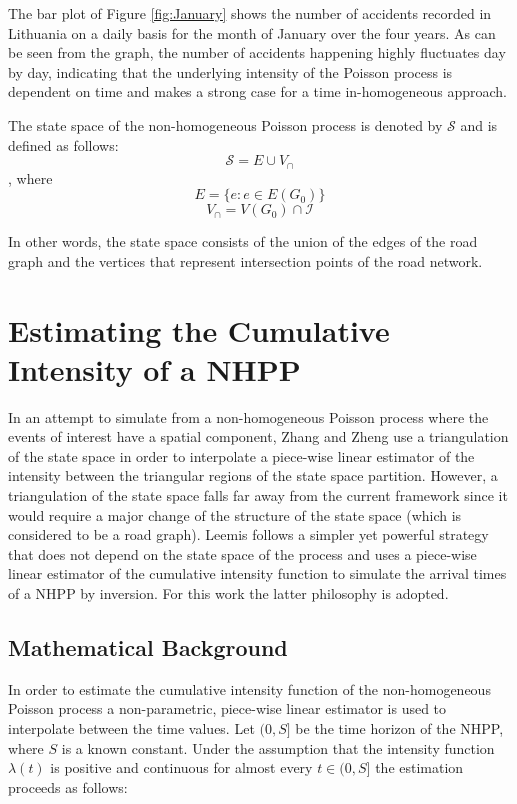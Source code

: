 \documentclass[12pt]{article}
\theoremstyle{definition}
\begin{document}
The bar plot of Figure \ref{fig:January} shows the number of accidents recorded in Lithuania on a daily basis for the month of January over the four years. As can be seen from the graph, the number of accidents happening highly fluctuates day by day, indicating that the underlying intensity of the Poisson process is dependent on time and makes a strong case for a time in-homogeneous approach. 

The state space of the non-homogeneous Poisson process is denoted by $\mathcal{S}$ and is defined as follows:
\begin{equation}
    \mathcal{S} =  E\cup V_{\cap}
\end{equation}, where
\begin{equation*}
    E = \{e: e\in E(G_0)\}
\end{equation*}
\begin{equation*}
    V_{\cap} = V(G_0) \cap \mathcal{I}
\end{equation*}

In other words, the state space consists of the union of the edges of the road graph and the vertices that represent intersection points of the road network.

\section{Estimating the Cumulative Intensity of a NHPP}
In an attempt to simulate from a non-homogeneous Poisson process where the events of interest have a spatial component, Zhang and Zheng \cite{triangulation} use a triangulation of the state space in order to interpolate a piece-wise linear estimator of the intensity between the triangular regions of the state space partition. However, a triangulation of the state space falls far away from the current framework since it would require a major change of the structure of the state space (which is considered to be a road graph). Leemis \cite{nonparametric} follows a simpler yet powerful strategy that does not depend on the state space of the process and uses a piece-wise linear estimator of the cumulative intensity function to simulate the arrival times of a NHPP by inversion. For this work the latter philosophy is adopted. 
\subsection{Mathematical Background}
In order to estimate the cumulative intensity function of the non-homogeneous Poisson process a non-parametric, piece-wise linear estimator is used to interpolate between the time values. Let $(0,S]$ be the time horizon of the NHPP, where $S$ is a known constant. Under the assumption that the intensity function $\lambda(t)$ is positive and continuous for almost every $t\in(0, S]$ the estimation proceeds as follows:
\end{document}
